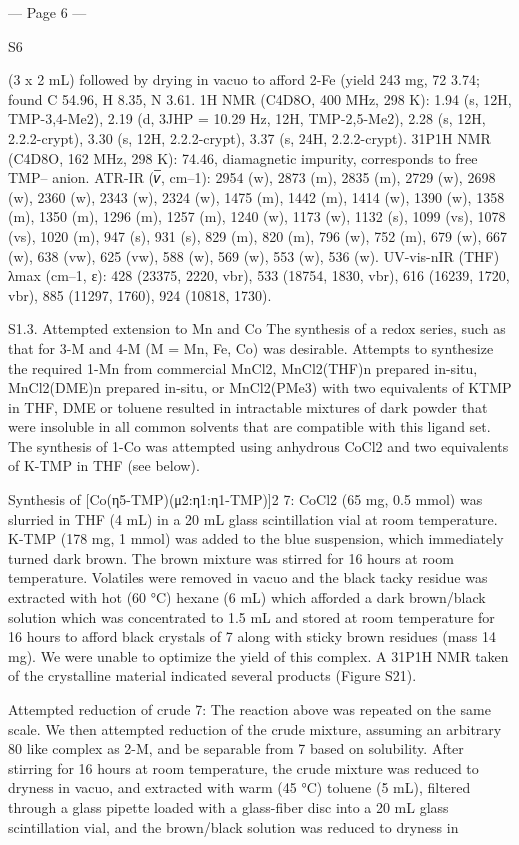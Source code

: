 --- Page 6 ---
 
 
S6 
 
 
(3 x 2 mL) followed by drying in vacuo to afford 2-Fe (yield 243 mg, 72%
3.74; found C 54.96, H 8.35, N 3.61. 1H NMR (C4D8O, 400 MHz, 298 K): 1.94 (s, 12H, TMP-3,4-Me2), 2.19 (d, 3JHP = 10.29 
Hz, 12H, TMP-2,5-Me2), 2.28 (s, 12H, 2.2.2-crypt), 3.30 (s, 12H, 2.2.2-crypt), 3.37 (s, 24H, 2.2.2-crypt). 31P{1H} NMR 
(C4D8O, 162 MHz, 298 K): 74.46, diamagnetic impurity, corresponds to free {TMP}– anion. ATR-IR (𝜈̅, cm–1): 2954 (w), 
2873 (m), 2835 (m), 2729 (w), 2698 (w), 2360 (w), 2343 (w), 2324 (w), 1475 (m), 1442 (m), 1414 (w), 1390 (w), 1358 (m), 
1350 (m), 1296 (m), 1257 (m), 1240 (w), 1173 (w), 1132 (s), 1099 (vs), 1078 (vs), 1020 (m), 947 (s), 931 (s), 829 (m), 820 
(m), 796 (w), 752 (m), 679 (w), 667 (w), 638 (vw), 625 (vw), 588 (w), 569 (w), 553 (w), 536 (w). UV-vis-nIR (THF) λmax 
(cm–1, ε): 428 (23375, 2220, vbr), 533 (18754, 1830, vbr), 616 (16239, 1720, vbr), 885 (11297, 1760), 924 (10818, 1730). 
 
S1.3. Attempted extension to Mn and Co 
The synthesis of a redox series, such as that for 3-M and 4-M (M = Mn, Fe, Co) was desirable. Attempts to synthesize the 
required 1-Mn from commercial MnCl2, MnCl2(THF)n prepared in-situ, MnCl2(DME)n prepared in-situ, or MnCl2(PMe3) with 
two equivalents of KTMP in THF, DME or toluene resulted in intractable mixtures of dark powder that were insoluble in all 
common solvents that are compatible with this ligand set. The synthesis of 1-Co was attempted using anhydrous CoCl2 and 
two equivalents of K-TMP in THF (see below). 
 
Synthesis of [Co(η5-TMP)(μ2:η1:η1-TMP)]2 7: CoCl2 (65 mg, 0.5 mmol) was slurried in THF (4 mL) in a 20 mL glass 
scintillation vial at room temperature. K-TMP (178 mg, 1 mmol) was added to the blue suspension, which immediately turned 
dark brown. The brown mixture was stirred for 16 hours at room temperature. Volatiles were removed in vacuo and the black 
tacky residue was extracted with hot (60 °C) hexane (6 mL) which afforded a dark brown/black solution which was 
concentrated to 1.5 mL and stored at room temperature for 16 hours to afford black crystals of 7 along with sticky brown 
residues (mass 14 mg). We were unable to optimize the yield of this complex. A 31P{1H} NMR taken of the crystalline material 
indicated several products (Figure S21). 
 
Attempted reduction of crude 7: The reaction above was repeated on the same scale. We then attempted reduction of the 
crude mixture, assuming an arbitrary 80%
like complex as 2-M, and be separable from 7 based on solubility. After stirring for 16 hours at room temperature, the crude 
mixture was reduced to dryness in vacuo, and extracted with warm (45 °C) toluene (5 mL), filtered through a glass pipette 
loaded with a glass-fiber disc into a 20 mL glass scintillation vial, and the brown/black solution was reduced to dryness in 


